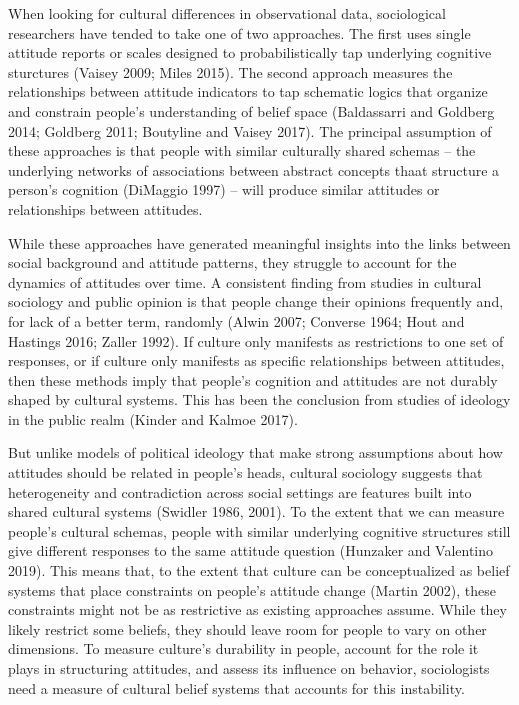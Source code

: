 \documentclass[12pt,]{article}
\begin{document}
When looking for cultural differences in observational data, sociological researchers have tended to take one of two approaches. The first uses single attitude reports or scales designed to probabilistically tap underlying cognitive sturctures (Vaisey 2009; Miles 2015). The second approach measures the relationships between attitude indicators to tap schematic logics that organize and constrain people's understanding of belief space (Baldassarri and Goldberg 2014; Goldberg 2011; Boutyline and Vaisey 2017). The principal assumption of these approaches is that people with similar culturally shared schemas -- the underlying networks of associations between abstract concepts thaat structure a person's cognition (DiMaggio 1997) -- will produce similar attitudes or relationships between attitudes.

While these approaches have generated meaningful insights into the links between social background and attitude patterns, they struggle to account for the dynamics of attitudes over time. A consistent finding from studies in cultural sociology and public opinion is that people change their opinions frequently and, for lack of a better term, randomly (Alwin 2007; Converse 1964; Hout and Hastings 2016; Zaller 1992). If culture only manifests as restrictions to one set of responses, or if culture only manifests as specific relationships between attitudes, then these methods imply that people's cognition and attitudes are not durably shaped by cultural systems. This has been the conclusion from studies of ideology in the public realm (Kinder and Kalmoe 2017).

But unlike models of political ideology that make strong assumptions about how attitudes should be related in people's heads, cultural sociology suggests that heterogeneity and contradiction across social settings are features built into shared cultural systems (Swidler 1986, 2001). To the extent that we can measure people's cultural schemas, people with similar underlying cognitive structures still give different responses to the same attitude question (Hunzaker and Valentino 2019). This means that, to the extent that culture can be conceptualized as belief systems that place constraints on people's attitude change (Martin 2002), these constraints might not be as restrictive as existing approaches assume. While they likely restrict some beliefs, they should leave room for people to vary on other dimensions. To measure culture's durability in people, account for the role it plays in structuring attitudes, and assess its influence on behavior, sociologists need a measure of cultural belief systems that accounts for this instability.
\end{document}
